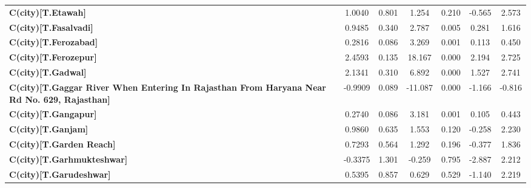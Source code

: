 \begin{center}
\begin{tabular}{lcccccc}
\textbf{C(city)[T.Etawah]}                                                                          &       1.0040  &        0.801     &     1.254  &         0.210        &       -0.565    &        2.573     \\
\textbf{C(city)[T.Fasalvadi]}                                                                       &       0.9485  &        0.340     &     2.787  &         0.005        &        0.281    &        1.616     \\
\textbf{C(city)[T.Ferozabad]}                                                                       &       0.2816  &        0.086     &     3.269  &         0.001        &        0.113    &        0.450     \\
\textbf{C(city)[T.Ferozepur]}                                                                       &       2.4593  &        0.135     &    18.167  &         0.000        &        2.194    &        2.725     \\
\textbf{C(city)[T.Gadwal]}                                                                          &       2.1341  &        0.310     &     6.892  &         0.000        &        1.527    &        2.741     \\
\textbf{C(city)[T.Gaggar River When Entering In Rajasthan From Haryana Near Rd No. 629, Rajasthan]} &      -0.9909  &        0.089     &   -11.087  &         0.000        &       -1.166    &       -0.816     \\
\textbf{C(city)[T.Gangapur]}                                                                        &       0.2740  &        0.086     &     3.181  &         0.001        &        0.105    &        0.443     \\
\textbf{C(city)[T.Ganjam]}                                                                          &       0.9860  &        0.635     &     1.553  &         0.120        &       -0.258    &        2.230     \\
\textbf{C(city)[T.Garden Reach]}                                                                    &       0.7293  &        0.564     &     1.292  &         0.196        &       -0.377    &        1.836     \\
\textbf{C(city)[T.Garhmukteshwar]}                                                                  &      -0.3375  &        1.301     &    -0.259  &         0.795        &       -2.887    &        2.212     \\
\textbf{C(city)[T.Garudeshwar]}                                                                     &       0.5395  &        0.857     &     0.629  &         0.529        &       -1.140    &        2.219     \\

\end{tabular}
\end{center}
